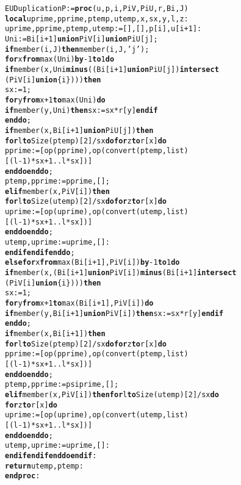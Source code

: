 \vspace{-0.4cm}
\begin{alltt}
EUDuplicationP := \textbf{proc}(u, p, i, PiV, PiU, r, Bi, J)
 \textbf{local} uprime, pprime, ptemp, utemp, x, sx, y, l, z:
uprime, pprime, ptemp, utemp   := [], [],  p[i], u[i+1]:
Uni:= Bi[i+1] \textbf{union} PiV[i] \textbf{union} PiU[j];
\textbf{if} member(i, J) \textbf{then} member(i, J, 'j');
  \textbf{for} x \textbf{from} max(Uni) \textbf{by} -1 \textbf{to} 1 \textbf{do}
    \textbf{if} member(x, Uni \textbf{minus} ((Bi[i+1] \textbf{union} PiU[j]) \textbf{intersect} 
    (PiV[i] \textbf{union} \{i\}))) \textbf{then} 
      sx := 1;
      \textbf{for} y \textbf{from} x+1 \textbf{to} max(Uni) \textbf{do}
        \textbf{if} member(y, Uni) \textbf{then}  sx := sx*r[y] \textbf{end if}
      \textbf{end do}; 
      \textbf{if} member(x, Bi[i+1] \textbf{union} PiU[j]) \textbf{then}
        \textbf{for} l \textbf{to} Size(ptemp)[2]/sx \textbf{do} \textbf{for} z \textbf{to} r[x] \textbf{do} 
            pprime := [op(pprime), op(convert(ptemp, list)
            [(l-1)*sx+1 .. l*sx])]
        \textbf{end do} \textbf{end do};
        ptemp,  pprime := pprime, [];
      \textbf{elif} member(x, PiV[i]) \textbf{then} 
        \textbf{for} l \textbf{to} Size(utemp)[2]/sx \textbf{do} \textbf{for} z \textbf{to} r[x] \textbf{do} 
            uprime := [op(uprime), op(convert(utemp, list)
            [(l-1)*sx+1 .. l*sx])] 
        \textbf{end do} \textbf{end do};
        utemp, uprime := uprime, []:
\textbf{end if} \textbf{end if} \textbf{end do};
\textbf{else} \textbf{for} x \textbf{from} max(Bi[i+1], PiV[i]) \textbf{by} -1 \textbf{to} 1 \textbf{do}
    \textbf{if} member(x, (Bi[i+1] \textbf{union} PiV[i]) \textbf{minus} (Bi[i+1] \textbf{intersect} 
    (PiV[i] \textbf{union} \{i\}))) \textbf{then}
      sx := 1;
      \textbf{for} y \textbf{from} x+1 \textbf{to} max(Bi[i+1], PiV[i]) \textbf{do}
        \textbf{if} member(y, Bi[i+1] \textbf{union} PiV[i]) \textbf{then} sx := sx*r[y] \textbf{end if} 
      \textbf{end do};
      \textbf{if} member(x, Bi[i+1]) \textbf{then} 
        \textbf{for} l \textbf{to} Size(ptemp)[2]/sx \textbf{do} \textbf{for} z \textbf{to} r[x] \textbf{do} 
            pprime := [op(pprime), op(convert(ptemp, list)
            [(l-1)*sx+1 .. l*sx])]
        \textbf{end do} \textbf{end do};
        ptemp, pprime := psiprime, [];
      \textbf{elif} member(x, PiV[i]) \textbf{then} \textbf{for} l \textbf{to} Size(utemp)[2]/sx \textbf{do}
       \textbf{for} z \textbf{to} r[x] \textbf{do}
            uprime := [op(uprime), op(convert(utemp, list)
            [(l-1)*sx+1 .. l*sx])]
        \textbf{end do} \textbf{end do};
        utemp, uprime := uprime, []:
\textbf{end if} \textbf{end if} \textbf{end do} \textbf{end if}:
\textbf{return} utemp, ptemp:
\textbf{end proc}:
\end{alltt}


